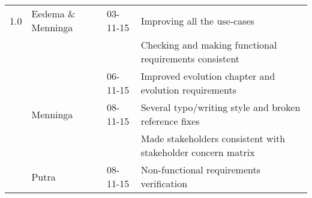 \begin{longtable}{L{} L{} L{} L{}}
	
	
	1.0				& Eedema \& Menninga & 03-11-15 & Improving all the use-cases \\
					& 					 & 			& Checking and making functional requirements consistent \\
					&       			 & 06-11-15 & Improved evolution chapter and evolution requirements \\
					& Menninga			 & 08-11-15 & Several typo/writing style and broken reference fixes \\
					& 					 & 			& Made stakeholders consistent with stakeholder concern matrix \\
					& Putra				 & 08-11-15 & Non-functional requirements verification \\

	\bottomrule
\end{longtable}
